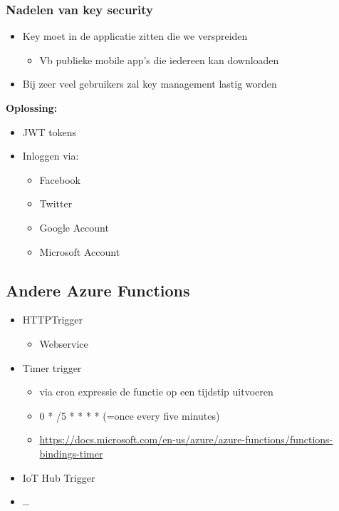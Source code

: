 \documentclass{article}
\newcommand{\bold}[1]{\textbf{#1}}
\begin{document}
\subsubsection{Nadelen van key security}
\begin{itemize}
    \item Key moet in de applicatie zitten die we verspreiden
    \begin{itemize}
        \item Vb publieke mobile app’s die iedereen kan downloaden
    \end{itemize}
    \item Bij zeer veel gebruikers zal key management lastig worden
\end{itemize}

\bold{Oplossing:}

\begin{itemize}
    \item JWT tokens
    \item Inloggen via:
    \begin{itemize}
        \item Facebook
        \item Twitter
        \item Google Account
        \item Microsoft Account
    \end{itemize}
\end{itemize}

\subsection{Andere Azure Functions}
\begin{itemize}
    \item HTTPTrigger
    \begin{itemize}
        \item Webservice
    \end{itemize}
    \item Timer trigger
    \begin{itemize}
        \item via cron expressie de functie op een tijdstip uitvoeren
        \item 0 * /5 * * * *  (=once every five minutes)
        \item \url{https://docs.microsoft.com/en-us/azure/azure-functions/functions-bindings-timer}
    \end{itemize}
    \item IoT Hub Trigger
    \item \dots
\end{itemize}
\end{document}
